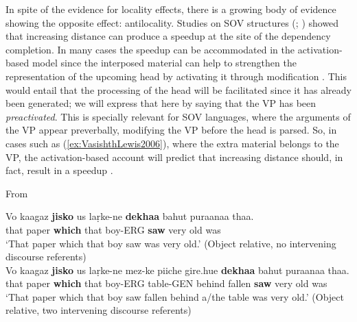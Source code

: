 \documentclass{frontiersSCNS}\usepackage{knitr}
\begin{document}
In spite of the evidence for locality effects, there is a growing body of evidence showing the opposite effect: antilocality. Studies on SOV structures (\citealp[in Hindi:][]{Vasishth2003,VasishthLewis2006}; \citealp[ and in German:][]{Konieczny2000,KoniecznyDoering2003,LevyKeller2012}) showed that increasing distance can produce a  speedup at the site of the dependency completion. In many cases the speedup can be accommodated in the activation-based model since the interposed material can help to strengthen the representation of the upcoming head by activating it through modification \citep{VasishthLewis2006}. This would entail that the processing of the head will be facilitated since it has already been generated; we will express that here by saying that the VP has been \emph{preactivated}. This is specially relevant for SOV languages, where the arguments of the VP appear preverbally, modifying the VP before the head is parsed. So, in cases such as (\ref{ex:VasishthLewis2006}), where the extra material belongs to the VP,  the activation-based account will predict that increasing distance should, in fact, result in a speedup   \citep[but only if the decay does not offset the benefit of activation;][]{LewisEtAl2006}.

\begin{exe} 
\ex From \citet{VasishthLewis2006} \label{ex:VasishthLewis2006}
\begin{xlist}
\ex 
\gll Vo kaagaz \textbf{jisko} us la\d{r}ke-ne \textbf{dekhaa} bahut puraanaa thaa. \\
 that paper \textbf{which} that boy-ERG \textbf{saw} very old was \\
\glt `That paper which that boy saw was very old.’ (Object relative, no intervening discourse referents) \\
\ex 
\gll Vo kaagaz \textbf{jisko} us la\d{r}ke-ne mez-ke piiche gire.hue \textbf{dekhaa} bahut puraanaa thaa. \\
 that paper \textbf{which} that boy-ERG table-GEN behind fallen \textbf{saw}  very old was\\
\glt  `That paper which that boy saw fallen behind a/the table was very old.’ (Object relative, two intervening discourse referents)\\
\end{xlist}
\end{exe}
\end{document}
